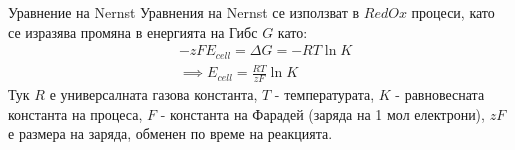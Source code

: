 \begin{frame}[t]{Уравнение на Nernst}
  Уравнения на Nernst се използват в $RedOx$ процеси, като се изразява промяна в енергията на Гибс $G$ като:
  \begin{align*}
    &-zFE_{cell} = \Delta G = -RT \ln K \\
    &\implies E_{cell} = \frac{RT}{zF} \ln K
  \end{align*}
  Тук $R$ е универсалната газова константа, $T$ - температурата, $K$ - равновесната константа на процеса,
  $F$ - константа на Фарадей (заряда на 1 мол електрони), $zF$ е размера на заряда, обменен по време на реакцията.
\end{frame}
